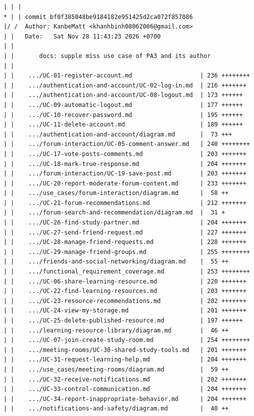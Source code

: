 \documentclass[12pt]{article}
\begin{document}
\begin{lstlisting}[numbers=none,breaklines=true]
| | |
* | | commit bf0f385048be9184182e951425d2ca072f857086
|/ /  Author: KanbeMatt <khanhbinh08062006@gmail.com>
| |   Date:   Sat Nov 28 11:43:23 2026 +0700
| |
| |       docs: supple miss use case of PA3 and its author
| |
| |    .../UC-01-register-account.md                   | 236 ++++++++
| |    .../authentication-and-account/UC-02-log-in.md  | 216 +++++++
| |    .../authentication-and-account/UC-08-logout.md  | 173 ++++++
| |    .../UC-09-automatic-logout.md                   | 177 ++++++
| |    .../UC-10-recover-password.md                   | 195 ++++++
| |    .../UC-11-delete-account.md                     | 189 ++++++
| |    .../authentication-and-account/diagram.md       |  73 +++
| |    .../forum-interaction/UC-05-comment-answer.md   | 240 ++++++++
| |    .../UC-17-vote-posts-comments.md                | 203 +++++++
| |    .../UC-18-mark-true-response.md                 | 204 +++++++
| |    .../forum-interaction/UC-19-save-post.md        | 203 +++++++
| |    .../UC-20-report-moderate-forum-content.md      | 233 +++++++
| |    .../use_cases/forum-interaction/diagram.md      |  58 ++
| |    .../UC-21-forum-recommendations.md              | 212 +++++++
| |    .../forum-search-and-recommendation/diagram.md  |  31 +
| |    .../UC-26-find-study-partner.md                 | 204 +++++++
| |    .../UC-27-send-friend-request.md                | 227 +++++++
| |    .../UC-28-manage-friend-requests.md             | 228 +++++++
| |    .../UC-29-manage-friend-groups.md               | 255 ++++++++
| |    .../friends-and-social-networking/diagram.md    |  55 ++
| |    .../functional_requirement_coverage.md          | 253 ++++++++
| |    .../UC-06-share-learning-resource.md            | 220 +++++++
| |    .../UC-22-find-learning-resources.md            | 203 +++++++
| |    .../UC-23-resource-recommendations.md           | 202 +++++++
| |    .../UC-24-view-my-storage.md                    | 201 +++++++
| |    .../UC-25-delete-published-resource.md          | 197 ++++++
| |    .../learning-resource-library/diagram.md        |  46 ++
| |    .../UC-07-join-create-study-room.md             | 254 ++++++++
| |    .../meeting-rooms/UC-30-shared-study-tools.md   | 201 +++++++
| |    .../UC-31-request-learning-help.md              | 204 +++++++
| |    .../use_cases/meeting-rooms/diagram.md          |  59 ++
| |    .../UC-32-receive-notifications.md              | 202 +++++++
| |    .../UC-33-control-communication.md              | 204 +++++++
| |    .../UC-34-report-inappropriate-behavior.md      | 204 +++++++
| |    .../notifications-and-safety/diagram.md         |  40 ++

\end{lstlisting}
\end{document}
